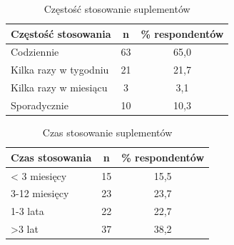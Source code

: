

\begin{table}[H]
    \centering
    \caption{Częstość stosowanie suplementów}
    \label{tab:cze-stos-supl}
    \begin{tabular}{|l|c|c|}
        \hline
        \textbf{Częstość stosowania} & \textbf{n} & \textbf{\% respondentów} \\
        \hline
        \hline
        Codziennie & 63 & 65,0 \\
        \hline
        Kilka razy w tygodniu & 21 & 21,7 \\
        \hline
        Kilka razy w miesiącu & 3 & 3,1 \\
        \hline
        Sporadycznie & 10 & 10,3 \\
        \hline
    \end{tabular}
\end{table}



\begin{table}[H]
    \centering
    \caption{Czas stosowanie suplementów}
    \label{tab:czas-stos-supl}
    \begin{tabular}{|l|c|c|}
        \hline
        \textbf{Czas stosowania} & \textbf{n} & \textbf{\% respondentów} \\
        \hline
        \hline
        < 3 miesięcy & 15 & 15,5 \\
        \hline
        3-12 miesięcy & 23 & 23,7 \\
        \hline
        1-3 lata & 22 & 22,7 \\
        \hline
        >3 lat & 37 & 38,2 \\
        \hline
    \end{tabular}
\end{table}

